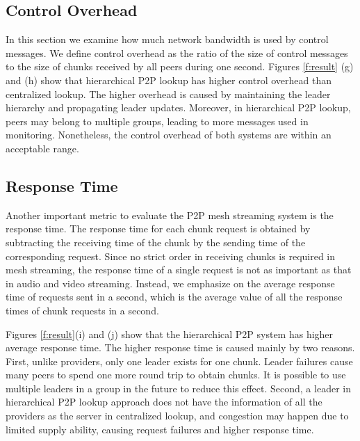 
    \subsection{Control Overhead}
    In this section we examine how much network bandwidth is used by
    control messages.
    We define control overhead as the ratio of the size of control
    messages to the size of chunks received by all peers during one
    second.
    Figures
    \ref{f:result} (g) and (h) show that hierarchical P2P lookup has 
    higher control overhead than centralized lookup.
    The higher overhead is caused by maintaining the
    leader hierarchy and propagating leader updates. 
    Moreover, in
    hierarchical P2P lookup, peers may belong to multiple %
    groups, leading to more messages used in monitoring.
    Nonetheless, the control overhead of both systems are within an
    acceptable range. 
    
\subsection{Response Time}
    Another important metric to evaluate the P2P mesh streaming system
    is the response time. 
    The response time for each chunk request
    is obtained by subtracting the receiving time of the chunk by the
    sending time of the corresponding request.     Since %
    no strict order in receiving
    chunks is required in mesh streaming, the response time of a
    single request is not as important as that in audio and video
    streaming. Instead, we emphasize on the average response time of
    requests sent in a second, which is  %
    the average value of all the response times of chunk requests in a
    second.

    Figures \ref{f:result}(i) and (j) show that the hierarchical P2P system
    has higher average response time.
    The higher response time is caused mainly by two reasons.
    First, unlike providers, only one leader exists for one chunk.
    Leader failures cause many peers to spend one more round trip
    to obtain chunks. It is possible to use multiple leaders in a
    group in the future to reduce this effect. 
    Second, a leader in hierarchical P2P lookup approach does not have
    the information of all the providers as the server in centralized
    lookup, and congestion may happen due to limited supply ability,  %
    causing request failures and higher response time. %

